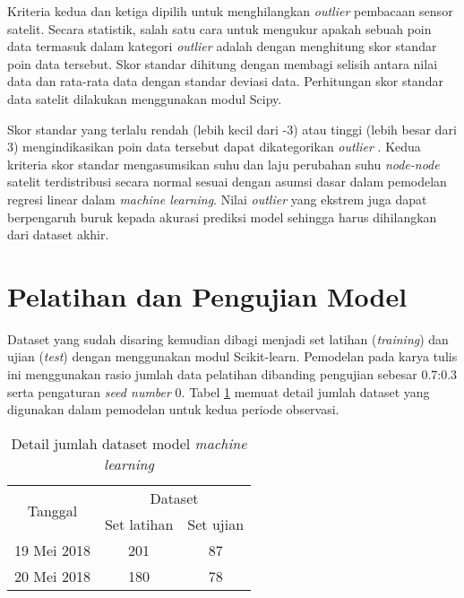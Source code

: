 Kriteria kedua dan ketiga dipilih untuk menghilangkan \textit{outlier}
pembacaan sensor satelit. Secara statistik, salah satu cara untuk mengukur
apakah sebuah poin data termasuk dalam kategori \textit{outlier} adalah dengan
menghitung skor standar poin data tersebut. Skor standar dihitung dengan
membagi selisih antara nilai data dan rata-rata data dengan standar deviasi
data. Perhitungan skor standar data satelit dilakukan menggunakan modul Scipy.

Skor standar yang terlalu rendah (lebih kecil dari -3) atau tinggi (lebih besar
dari 3) mengindikasikan poin data tersebut dapat dikategorikan \textit{outlier}
\cite{boschetti2015}. Kedua kriteria skor standar mengasumsikan suhu dan laju
perubahan suhu \textit{node-node} satelit terdistribusi secara normal sesuai
dengan asumsi dasar dalam pemodelan regresi linear dalam \textit{machine
learning}. Nilai \textit{outlier} yang ekstrem juga dapat berpengaruh buruk
kepada akurasi prediksi model sehingga harus dihilangkan dari dataset akhir.

\section{Pelatihan dan Pengujian Model}

Dataset yang sudah disaring kemudian dibagi menjadi set latihan
(\textit{training}) dan ujian (\textit{test}) dengan menggunakan modul
Scikit-learn. Pemodelan pada karya tulis ini menggunakan rasio jumlah data
pelatihan dibanding pengujian sebesar 0.7:0.3 serta pengaturan \textit{seed
number} 0. Tabel \ref{table:dataset} memuat detail jumlah dataset yang
digunakan dalam pemodelan untuk kedua periode observasi.

\begin{table}[!ht]
\begin{center}
\caption{Detail jumlah dataset model \textit{machine learning}}
\label{table:dataset}
\begin{tabular}{|c|cc|}
\hline
\multirow{2}{*}{Tanggal} & \multicolumn{2}{c|}{Dataset}                 \\ \cline{2-3} 
                         & \multicolumn{1}{c|}{Set latihan} & Set ujian \\ \hline
19 Mei 2018              & \multicolumn{1}{c|}{201}         & 87        \\ \hline
20 Mei 2018              & \multicolumn{1}{c|}{180}         & 78        \\ \hline
\end{tabular}
\end{center}
\vspace{-5mm}
\end{table}
